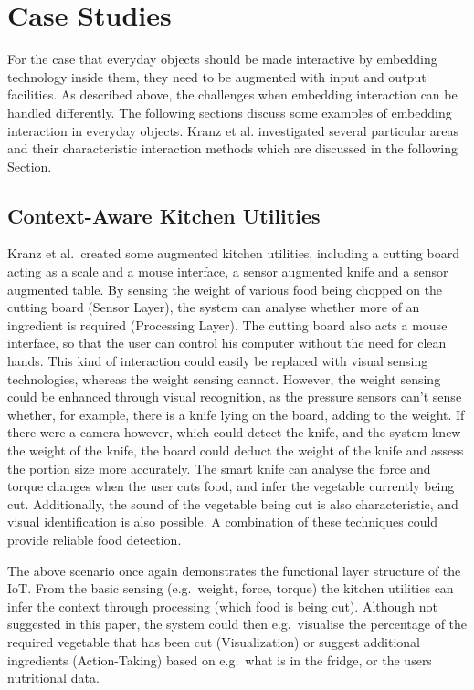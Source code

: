 \section{Case Studies}
\label{sec:caseStudies}
For the case that everyday objects should be made interactive by embedding technology inside them, they need to be augmented with input and output facilities.
As described above, the challenges when embedding interaction can be handled differently.
The following sections discuss some examples of embedding interaction in everyday objects.
Kranz et al. investigated several particular areas and their characteristic interaction methods \cite{kranz10} which are discussed in the following Section.

\subsection{Context-Aware Kitchen Utilities}
Kranz et al.\ created some augmented kitchen utilities, including a cutting board acting as a scale and a mouse interface, a sensor augmented knife and a sensor augmented table.
By sensing the weight of various food being chopped on the cutting board (Sensor Layer), the system can analyse whether more of an ingredient is required (Processing Layer).
The cutting board also acts a mouse interface, so that the user can control his computer without the need for clean hands.
This kind of interaction could easily be replaced with visual sensing technologies, whereas the weight sensing cannot.
However, the weight sensing could be enhanced through visual recognition, as the pressure sensors can't sense whether, for example, there is a knife lying on the board, adding to the weight.
If there were a camera however, which could detect the knife, and the system knew the weight of the knife, the board could deduct the weight of the knife and assess the portion size more accurately.
The smart knife can analyse the force and torque changes when the user cuts food, and infer the vegetable currently being cut.
Additionally, the sound of the vegetable being cut is also characteristic, and visual identification is also possible.
A combination of these techniques could provide reliable food detection.

The above scenario once again demonstrates the functional layer structure of the IoT.
From the basic sensing (e.g.\ weight, force, torque) the kitchen utilities can infer the context through processing (which food is being cut).
Although not suggested in this paper, the system could then e.g.\ visualise the percentage of the required vegetable that has been cut (Visualization) or suggest additional ingredients (Action-Taking) based on e.g.\ what is in the fridge, or the users nutritional data.

